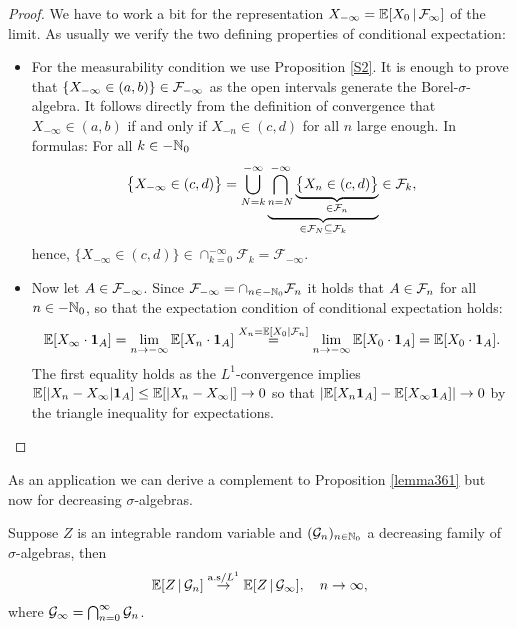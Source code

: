 \begin{proof}[Proof]
	We have to work a bit for the representation $X_{-\infty} = \mathbb{E}[X_0\,|\,\mathcal{F}_{\infty}]$ of the limit. As usually we verify the two defining properties of conditional expectation:
	\begin{itemize}
		\item For the measurability condition we use Proposition \ref{S2}. It is enough to prove that $\{X_{-\infty} \in (a,b)\}\in  \mathcal{F}_{-\infty}$ as the open intervals generate the Borel-$\sigma$-algebra. It follows directly from the definition of convergence that $X_{-\infty}\in (a,b)$ if and only if $X_{-n}\in (c,d)$ for all $n$ large enough. In formulas: For all $k\in -\mathbb{N}_0$
		\begin{align*}
			\big\{X_{-\infty}\in (c,d)\big\} =\bigcup_{N=k}^{-\infty} \underbrace{\bigcap_{n=N }^{-\infty} \underbrace{\big\{ X_{n} \in (c,d)\big\}}_{\in \mathcal F_n}}_{\in \mathcal{F}_{N}\subseteq \mathcal F_k}\in \mathcal{F}_{k}, 
		\end{align*}
		hence,  $\big\{X_{-\infty}\in (c,d)\big\}\in \cap_{k=0}^{-\infty} \mathcal F_k=\mathcal F_{-\infty}$.
		\item
			Now let $A\in\mathcal{F}_{-\infty}$. Since $\mathcal F_{-\infty}=\cap_{n\in-\mathbb{N}_0} \mathcal{F}_{n}$ it holds that $A \in \mathcal{F}_n$ for all $n\in -\mathbb{N}_0$, so that the expectation condition of conditional expectation holds:
			\begin{align*}
				\mathbb{E}[X_{\infty}\cdot \mathbf 1_A] = \lim\limits_{n\to-\infty}\mathbb{E}[X_{n}\cdot \mathbf 1_A] \overset{X_{n} = \mathbb{E}[X_0|\mathcal F_{n}]}{=} \lim\limits_{n\to-\infty}\mathbb{E}[X_0\cdot \mathbf 1_A] = \mathbb{E}[X_0 \cdot \mathbf 1_A].
			\end{align*}
			The first equality holds as the $L^1$-convergence implies $\mathbb{E}[|X_n-X_\infty|\mathbf 1_A]\leq \mathbb{E}[|X_n-X_\infty|]\to 0$ so that $|\mathbb{E}[X_n\mathbf 1_A]-\mathbb{E}[X_\infty \mathbf 1_A]|\to 0$ by the triangle inequality for expectations.
	\end{itemize}
\end{proof}
As an application we can derive a complement to Proposition \ref{lemma361} but now for decreasing $\sigma$-algebras.
\begin{llemma}
\begin{prop}\label{corollary_354}
	Suppose $Z$ is an integrable random variable and $(\mathcal{G}_n)_{n\in\mathbb{N}_0}$ a decreasing family of $\sigma$-algebras, then $$\mathbb{E}[Z\,|\,\mathcal{G}_n] \overset{\text{a.s}/L^1}{\to} \mathbb{E}[Z\,|\,\mathcal{G}_{\infty}], \quad n\to \infty,$$ where $\mathcal{G}_{\infty} = \bigcap_{n=0}^{\infty}\mathcal{G}_n$.
\end{prop}
\end{llemma}

